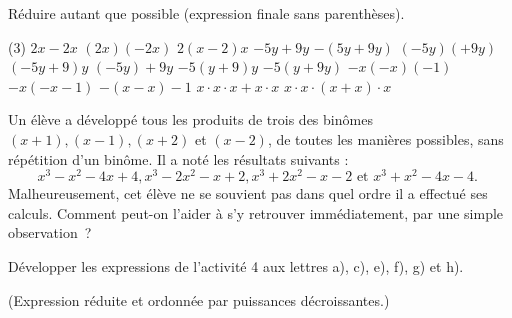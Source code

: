 \documentclass[a4paper,12pt]{report}
\begin{document}
\begin{exo}
Réduire autant que possible (expression finale sans parenthèses).
\begin{tasks}(3)
\task $2 x-2 x$
\task $(2 x)(-2 x)$
\task $2(x-2) x$
\task $-5 y+9 y$
\task $-(5 y+9 y)$
\task $(-5 y)(+9 y)$
\task $(-5 y+9) y$
\task $(-5 y)+9 y$
\task $-5(y+9) y$
\task $-5(y+9 y)$
\task $-x(-x)(-1)$
\task $-x(-x-1)$
\task $-(x-x)-1$
\task $x \cdot x \cdot x+x \cdot x$
\task $x \cdot x \cdot(x+x) \cdot x$
\end{tasks}
\end{exo}
\begin{exo}
Un élève a développé tous les produits de trois des binômes $(x+1),(x-1),(x+2)$ et $(x-2)$, de toutes les manières possibles, sans répétition d'un binôme. Il a noté les résultats suivants :
$$
x^3-x^2-4 x+4, x^3-2 x^2-x+2, x^3+2 x^2-x-2 \text { et } x^3+x^2-4 x-4 \text {. }
$$
Malheureusement, cet élève ne se souvient pas dans quel ordre il a effectué ses calculs.
Comment peut-on l'aider à s'y retrouver immédiatement, par une simple observation~?
\end{exo}
\begin{exo}
	Développer les expressions de l'activité 4 aux lettres a), c), e), f), g) et h). 

(Expression réduite et ordonnée par puissances décroissantes.)
\end{exo}
\end{document}

